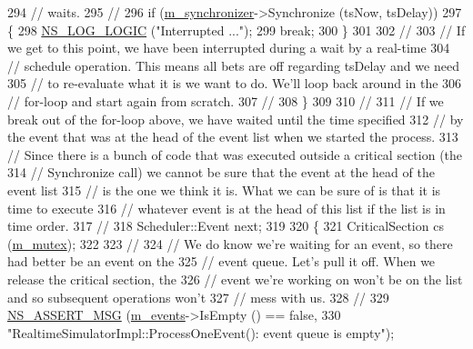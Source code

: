 \begin{DoxyCode}
294       \textcolor{comment}{// waits.}
295       \textcolor{comment}{//}
296       \textcolor{keywordflow}{if} (\hyperlink{classns3_1_1RealtimeSimulatorImpl_a87a72268b521afcae7ea4c891c398d27}{m\_synchronizer}->Synchronize (tsNow, tsDelay))
297         \{
298           \hyperlink{group__logging_ga88acd260151caf2db9c0fc84997f45ce}{NS\_LOG\_LOGIC} (\textcolor{stringliteral}{"Interrupted ..."});
299           \textcolor{keywordflow}{break};
300         \}
301  
302       \textcolor{comment}{//}
303       \textcolor{comment}{// If we get to this point, we have been interrupted during a wait by a real-time}
304       \textcolor{comment}{// schedule operation.  This means all bets are off regarding tsDelay and we need}
305       \textcolor{comment}{// to re-evaluate what it is we want to do.  We'll loop back around in the }
306       \textcolor{comment}{// for-loop and start again from scratch.}
307       \textcolor{comment}{//}
308     \}
309 
310   \textcolor{comment}{//}
311   \textcolor{comment}{// If we break out of the for-loop above, we have waited until the time specified}
312   \textcolor{comment}{// by the event that was at the head of the event list when we started the process.}
313   \textcolor{comment}{// Since there is a bunch of code that was executed outside a critical section (the}
314   \textcolor{comment}{// Synchronize call) we cannot be sure that the event at the head of the event list}
315   \textcolor{comment}{// is the one we think it is.  What we can be sure of is that it is time to execute}
316   \textcolor{comment}{// whatever event is at the head of this list if the list is in time order.}
317   \textcolor{comment}{//}
318   Scheduler::Event next;
319 
320   \{ 
321     CriticalSection cs (\hyperlink{classns3_1_1RealtimeSimulatorImpl_a02be368e7cbd8a6f9d62db36c3fd373b}{m\_mutex});
322 
323     \textcolor{comment}{// }
324     \textcolor{comment}{// We do know we're waiting for an event, so there had better be an event on the }
325     \textcolor{comment}{// event queue.  Let's pull it off.  When we release the critical section, the}
326     \textcolor{comment}{// event we're working on won't be on the list and so subsequent operations won't}
327     \textcolor{comment}{// mess with us.}
328     \textcolor{comment}{//}
329     \hyperlink{assert_8h_aff5ece9066c74e681e74999856f08539}{NS\_ASSERT\_MSG} (\hyperlink{classns3_1_1RealtimeSimulatorImpl_a0cccd690eafca8285f5cc4d3909a9593}{m\_events}->IsEmpty () == \textcolor{keyword}{false}, 
330                    \textcolor{stringliteral}{"RealtimeSimulatorImpl::ProcessOneEvent(): event queue is empty"});

\end{DoxyCode}
